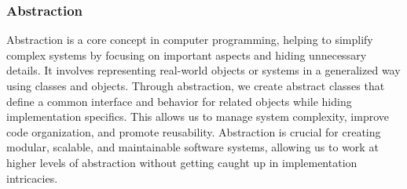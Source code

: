 \subsubsection*{Abstraction}

Abstraction is a core concept in computer programming, helping to simplify complex systems by focusing on important aspects and hiding unnecessary details. It involves representing real-world objects or systems in a generalized 
way using classes and objects. Through abstraction, we create abstract classes that define a common interface and behavior for related objects while hiding implementation specifics. This allows us to manage system complexity, 
improve code organization, and promote reusability. Abstraction is crucial for creating modular, scalable, and maintainable software systems, allowing us to work at higher levels of abstraction without getting caught up in implementation intricacies.


